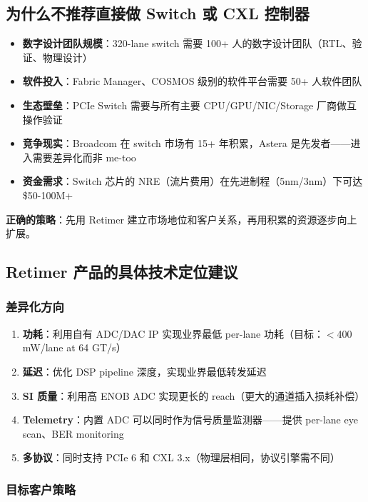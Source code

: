 \documentclass[11pt,a4paper]{ctexart}
\begin{document}
\subsection{为什么不推荐直接做 Switch 或 CXL 控制器}

\begin{itemize}
    \item \textbf{数字设计团队规模}：320-lane switch 需要 100+ 人的数字设计团队（RTL、验证、物理设计）
    \item \textbf{软件投入}：Fabric Manager、COSMOS 级别的软件平台需要 50+ 人软件团队
    \item \textbf{生态壁垒}：PCIe Switch 需要与所有主要 CPU/GPU/NIC/Storage 厂商做互操作验证
    \item \textbf{竞争现实}：Broadcom 在 switch 市场有 15+ 年积累，Astera 是先发者——进入需要差异化而非 me-too
    \item \textbf{资金需求}：Switch 芯片的 NRE（流片费用）在先进制程（5nm/3nm）下可达 \$50-100M+
\end{itemize}

\textbf{正确的策略}：先用 Retimer 建立市场地位和客户关系，再用积累的资源逐步向上扩展。

\subsection{Retimer 产品的具体技术定位建议}

\subsubsection{差异化方向}

\begin{enumerate}
    \item \textbf{功耗}：利用自有 ADC/DAC IP 实现业界最低 per-lane 功耗（目标：$<$400 mW/lane at 64 GT/s）
    \item \textbf{延迟}：优化 DSP pipeline 深度，实现业界最低转发延迟
    \item \textbf{SI 质量}：利用高 ENOB ADC 实现更长的 reach（更大的通道插入损耗补偿）
    \item \textbf{Telemetry}：内置 ADC 可以同时作为信号质量监测器——提供 per-lane eye scan、BER monitoring
    \item \textbf{多协议}：同时支持 PCIe 6 和 CXL 3.x（物理层相同，协议引擎需不同）
\end{enumerate}

\subsubsection{目标客户策略}
\end{document}
